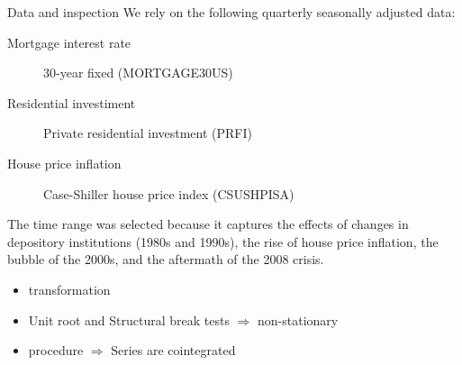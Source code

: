 \documentclass[10pt]{beamer}
\begin{document}
\begin{frame}[label={sec:orgb477d0a}]{Data and inspection}
\label{DataInspection}
We rely on the following quarterly seasonally adjusted data:
\begin{description}
\item[{Mortgage interest rate}] 30-year fixed (MORTGAGE30US)
\item[{Residential investiment}] Private residential investment (PRFI)
\item[{House price inflation}] Case-Shiller house price index (CSUSHPISA)
\end{description}

The time range was selected because it captures the effects of changes in depository institutions (1980s and 1990s), the rise of house price inflation, the bubble of the 2000s, and the aftermath of the 2008 crisis.

\begin{itemize}
\item \textcite{yeo_new_2000} transformation \hyperlink{YeoTransformation}{}
\item Unit root and Structural break tests \(\Rightarrow\) non-stationary \hyperlink{UnitTest}{}
\item \textcite{johansen_estimation_1991} procedure \(\Rightarrow\) Series are cointegrated \hyperlink{CointTest}{}
\end{itemize}
\end{frame}
\end{document}

